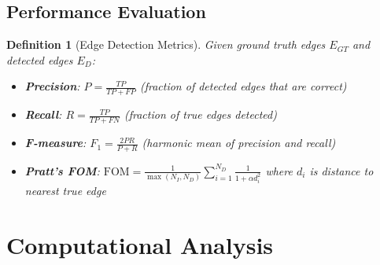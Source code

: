 \documentclass[a4paper, 11pt]{article}
\newtheorem{definition}{Definition}[section]
\begin{document}
\subsection{Performance Evaluation}

\begin{definition}[Edge Detection Metrics]
Given ground truth edges $E_{GT}$ and detected edges $E_{D}$:
\begin{itemize}
\item \textbf{Precision}: $P = \frac{TP}{TP + FP}$ (fraction of detected edges that are correct)
\item \textbf{Recall}: $R = \frac{TP}{TP + FN}$ (fraction of true edges detected)
\item \textbf{F-measure}: $F_1 = \frac{2PR}{P+R}$ (harmonic mean of precision and recall)
\item \textbf{Pratt's FOM}: $\text{FOM} = \frac{1}{\max(N_I, N_D)}\sum_{i=1}^{N_D}\frac{1}{1+\alpha d_i^2}$ where $d_i$ is distance to nearest true edge
\end{itemize}
\end{definition}

\section{Computational Analysis}
\end{document}
